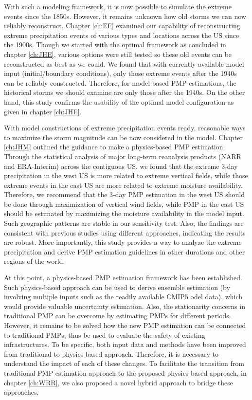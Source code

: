With such a modeling framework, it is now possible to simulate the extreme events since the 1850s. However, it remains unknown how old storms we can now reliably reconstruct. Chapter \ref{ch:EF} examined our capability of reconstructing extreme precipitation events of various types and locations across the US since the 1900s. Though we started with the optimal framework as concluded in chapter \ref{ch:JHE}, various options were still tested so these old events can be reconstructed as best as we could. We found that with currently available model input (initial/boundary conditions), only those extreme events after the 1940s can be reliably constructed. Therefore, for model-based PMP estimations, the historical storms we should examine are only those after the 1940s. On the other hand, this study confirms the usability of the optimal model configuration as given in chapter \ref{ch:JHE}.

With model constructions of extreme precipitation events ready, reasonable ways to maximize the storm magnitude can be now considered in the model. Chapter \ref{ch:JHM} outlined the guidance to make a physics-based PMP estimation. Through the statistical analysis of major long-term reanalysis products (NARR and ERA-Interim) across the contiguous US, we found that the extreme 3-day precipitation in the west US is more related to extreme vertical fields, while those extreme events in the east US are more related to extreme moisture availability. Therefore, we recommend that the 3-day PMP estimation in the west US should be done through maximization of vertical wind fields, while PMP in the east US should be estimated by maximizing the moisture availability in the model input. Such geographic patterns are stable in our sensitivity test. Also, the findings are consistent with previous studies using different approaches, indicating the results are robust. More importantly, this study provides a way to analyze the extreme precipitation and derive PMP estimation guidelines in other durations and other regions of the world.

At this point, a physics-based PMP estimation framework has been established. Such physics-based approach can be used to derive ensemble estimation (by involving multiple inputs such as the readily available CMIP5 odel data), which would provide valuable uncertainty estimation. Also, the stationarity concerns in traditional PMP can be overcome by estimating PMPs for different periods. However, it remains to be solved how the new PMP estimation can be connected to traditional PMPs, thus be used to evaluate the safety of existing infrastructures. To be specific, both input data and methods have been improved from traditional to physics-based approach. Therefore, it is necessary to understand the impact of each of these changes. To facilitate the transition from traditional PMP estimation approach to the proposed physics-based approach, in chapter \ref{ch:WRR}, we also proposed a novel hybrid approach to bridge these approaches.

